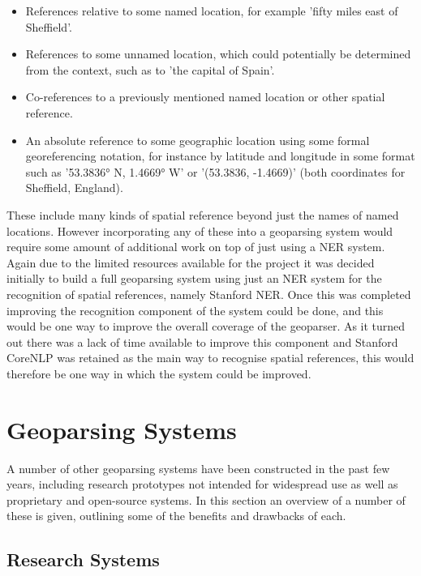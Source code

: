 \documentclass[12pt, a4paper]{report}
\begin{document}
\begin{itemize}
	\item { References relative to some named location, for example 'fifty miles east of Sheffield'. }
	\item { References to some unnamed location, which could potentially be determined from the context, such as to 'the capital of Spain'.}
	\item { Co-references to a previously mentioned named location or other spatial reference. }
	\item { An absolute reference to some geographic location using some formal georeferencing notation, for instance by latitude and longitude in some format such as '53.3836° N, 1.4669° W' or '(53.3836, -1.4669)' (both coordinates for Sheffield, England). }
\end{itemize}

These include many kinds of spatial reference beyond just the names of named locations. However incorporating any of these into a geoparsing system would require some amount of additional work on top of just using a NER system. Again due to the limited resources available for the project it was decided initially to build a full geoparsing system using just an NER system for the recognition of spatial references, namely Stanford NER. Once this was completed improving the recognition component of the system could be done, and this would be one way to improve the overall coverage of the geoparser. As it turned out there was a lack of time available to improve this component and Stanford CoreNLP was retained as the main way to recognise spatial references, this would therefore be one way in which the system could be improved.

\section{Geoparsing Systems}
\label{sec:geoparsing_systems}

A number of other geoparsing systems have been constructed in the past few years, including research prototypes not intended for widespread use as well as proprietary and open-source systems. In this section an overview of a number of these is given, outlining some of the benefits and drawbacks of each.

\subsection{Research Systems}
\label{subsec:research_systems}
\end{document}
